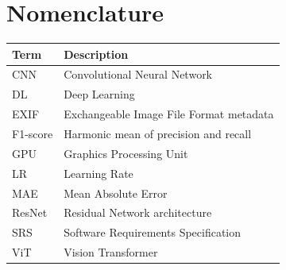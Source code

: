 \tableofcontents

\listoftables

\listoffigures

\section*{Nomenclature}

\begin{longtable}{p{}p{}}
\textbf{Term} & \textbf{Description} \\
\hline
CNN & Convolutional Neural Network \\
DL & Deep Learning \\
EXIF & Exchangeable Image File Format metadata \\
F1-score & Harmonic mean of precision and recall \\
GPU & Graphics Processing Unit \\
LR & Learning Rate \\
MAE & Mean Absolute Error \\
ResNet & Residual Network architecture \\
SRS & Software Requirements Specification \\
ViT & Vision Transformer \\
\end{longtable}

